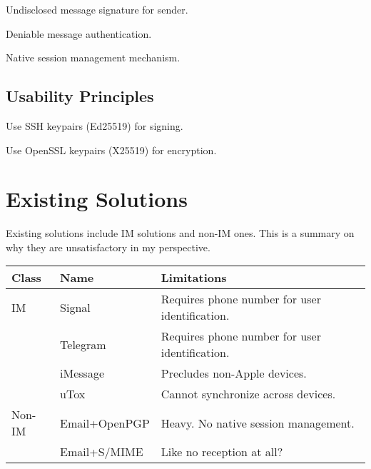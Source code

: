 \begin{compactitem}
	\item Undisclosed message signature for sender.
	\item Deniable message authentication.
	\item Native session management mechanism.
\end{compactitem}

\subsection{Usability Principles}

\begin{compactitem}
	\item Use SSH keypairs (Ed25519) for signing.
	\item Use OpenSSL keypairs (X25519) for encryption.
\end{compactitem}










\section{Existing Solutions}

Existing solutions include IM solutions and non-IM ones. This is a summary on why they are unsatisfactory in my perspective.

\begin{tabu}{|l|l|X|}
	\hline
	{Class}  & {Name}          & {Limitations}                                    \\
	\hline
	{IM}     & {Signal}        & {Requires phone number for user identification.} \\
	{ }      & {Telegram}      & {Requires phone number for user identification.} \\
	{ }      & {iMessage}      & {Precludes non-Apple devices.}                   \\
	{ }      & {uTox}          & {Cannot synchronize across devices.}             \\
	\hline
	{Non-IM} & {Email+OpenPGP} & {Heavy. No native session management.}           \\
	{ }      & {Email+S/MIME}  & {Like no reception at all?}                      \\
	\hline
\end{tabu}










